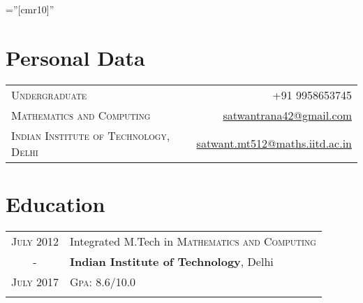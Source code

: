 \documentclass[a4paper,10pt]{article} %
\begin{document}
\pagestyle{empty} %

\font\fb=''[cmr10]'' %




\par{\bigskip\par} %

\section{Personal Data}

\begin{tabular}{lr}
\textsc{Undergraduate} &\textsc{+91 9958653745}\\
\textsc{Mathematics and Computing } & \href{mailto:satwantrana42@gmail.com}{satwantrana42@gmail.com}\\
\textsc{Indian Institute of Technology, Delhi\ \ \ \ \ \ \ \ \ \ \ \ \ \ \ \ } & \href{mailto:satwant.mt512@maths.iitd.ac.in}{satwant.mt512@maths.iitd.ac.in}
\end{tabular}


\section{Education}

\begin{tabular}{cl}	

\textsc{July} 2012 & Integrated M.Tech in \textsc{}\textsc{Mathematics and Computing} \\
- &\textbf{Indian Institute of Technology}, Delhi\\
\textsc{July} 2017 &\normalsize \textsc{Gpa}: 8.6/10.0 \\
&\\

\end{tabular}

\end{document}
